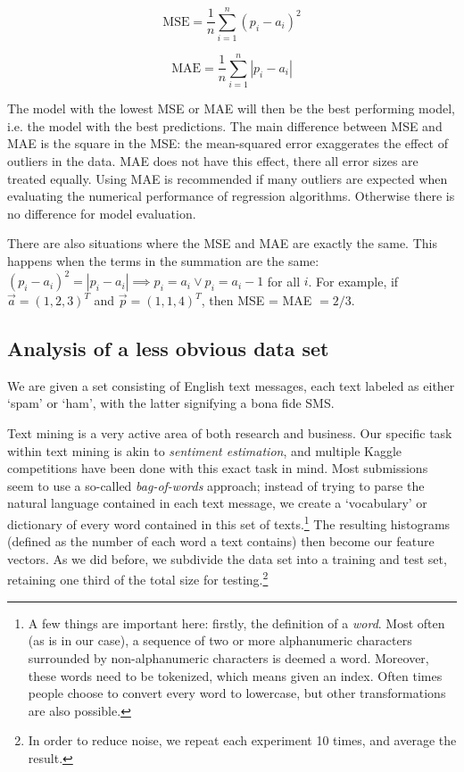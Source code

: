 \documentclass[runningheads,a4paper]{llncs}
\begin{document}
\noindent\begin{minipage}{.5\linewidth}
\begin{equation*}
  \text{MSE} = \frac{1}{n} \sum_{i=1}^n (p_i - a_i)^2
\end{equation*}
\end{minipage}%
\begin{minipage}{.5\linewidth}
\begin{equation*}
  \text{MAE} = \frac{1}{n} \sum_{i=1}^n |p_i - a_i|
\end{equation*}
\end{minipage}

The model with the lowest MSE or MAE will then be the best performing model, i.e. the model with the best predictions. The main difference between MSE and MAE is the square in the MSE: the mean-squared error exaggerates the effect of outliers in the data. MAE does not have this effect, there all error sizes are treated equally. \cite{witten} Using MAE is recommended if many outliers are expected when evaluating the numerical performance of regression algorithms. Otherwise there is no difference for model evaluation.

There are also situations where the MSE and MAE are exactly the same. This happens when the terms in the summation are the same: $(p_i - a_i)^2 = |p_i - a_i| \implies p_i = a_i \lor p_i = a_i - 1$ for all $i$. For example, if $\vec{a}=(1, 2, 3)^T$ and $\vec{p}=(1, 1, 4)^T$, then MSE = MAE $= 2/3$. 

\subsection{Analysis of a less obvious data set}
We are given a set consisting of English text messages, each text labeled as either `spam' or `ham', with the latter signifying a bona fide SMS. 

Text mining is a very active area of both research and business.  Our specific task within text mining is akin to \emph{sentiment estimation}, and multiple Kaggle competitions have been done with this exact task in mind.  Most submissions seem to use a so-called \emph{bag-of-words} approach; instead of trying to parse the natural language contained in each text message, we create a `vocabulary' or dictionary of every word contained in this set of texts.\footnote{A few things are important here: firstly, the definition of a \emph{word}. Most often (as is in our case), a sequence of two or more alphanumeric characters surrounded by non-alphanumeric characters is deemed a word.  Moreover, these words need to be tokenized, which means given an index.  Often times people choose to convert every word to lowercase, but other transformations are also possible.}
The resulting histograms (defined as the number of each word a text contains) then become our feature vectors.  As we did before, we subdivide the data set into a training and test set, retaining one third of the total size for testing.\footnote{In order to reduce noise, we repeat each experiment 10 times, and average the result.}
\end{document}
